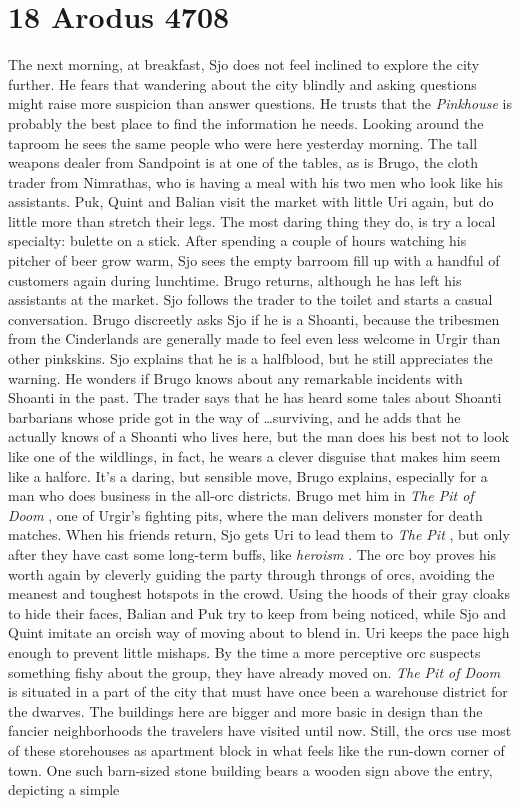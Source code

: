 \section{18 Arodus 4708}

The next morning, at breakfast, Sjo does not feel inclined to explore the city further. He fears that wandering about the city blindly and asking questions might raise more suspicion than answer questions. He trusts that the {\itshape Pinkhouse} is probably the best place to find the information he needs. Looking around the taproom he sees the same people who were here yesterday morning. The tall weapons dealer from Sandpoint is at one of the tables, as is Brugo, the cloth trader from Nimrathas, who is having a meal with his two men who look like his assistants. Puk, Quint and Balian visit the market with little Uri again, but do little more than stretch their legs. The most daring thing they do, is try a local specialty: bulette on a stick. After spending a couple of hours watching his pitcher of beer grow warm, Sjo sees the empty barroom fill up with a handful of customers again during lunchtime. Brugo returns, although he has left his assistants at the market. Sjo follows the trader to the toilet and starts a casual conversation. Brugo discreetly asks Sjo if he is a Shoanti, because the tribesmen from the Cinderlands are generally made to feel even less welcome in Urgir than other pinkskins. Sjo explains that he is a halfblood, but he still appreciates the warning. He wonders if Brugo knows about any remarkable incidents with Shoanti in the past. The trader says that he has heard some tales about Shoanti barbarians whose pride got in the way of \ldots surviving, and he adds that he actually knows of a Shoanti who lives here, but the man does his best not to look like one of the wildlings, in fact, he wears a clever disguise that makes him seem like a halforc. It's a daring, but sensible move, Brugo explains, especially for a man who does business in the all-orc districts. Brugo met him in {\itshape The Pit of Doom} , one of Urgir's fighting pits, where the man delivers monster for death matches. When his friends return, Sjo gets Uri to lead them to {\itshape The Pit} , but only after they have cast some long-term buffs, like  {\itshape heroism} . The orc boy proves his worth again by cleverly guiding the party through throngs of orcs, avoiding the meanest and toughest hotspots in the crowd. Using the hoods of their gray cloaks to hide their faces, Balian and Puk try to keep from being noticed, while Sjo and Quint imitate an orcish way of moving about to blend in. Uri keeps the pace high enough to prevent little mishaps. By the time a more perceptive orc suspects something fishy about the group, they have already moved on.  {\itshape The Pit of Doom} is situated in a part of the city that must have once been a warehouse district for the dwarves. The buildings here are bigger and more basic in design than the fancier neighborhoods the travelers have visited until now. Still, the orcs use most of these storehouses as apartment block in what feels like the run-down corner of town. One such barn-sized stone building bears a wooden sign above the entry, depicting a simple 